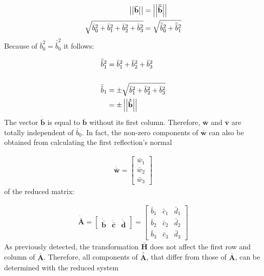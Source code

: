 \begin{align}
\left\vert\left\vert\mathbf{\bar{b}}\right\vert\right\vert 
&= 
\left\vert\left\vert\mathbf{\bar{\bar{b}}}\right\vert\right\vert
\\
\sqrt{\bar{b}_0^2 + \bar{b}_1^2 + \bar{b}_2^2 + \bar{b}_3^2}
&=
\sqrt{\bar{\bar{b}}_0^2 + \bar{\bar{b}}_1^2}
\end{align}
%
Because of $\bar{b}_0^2 = \bar{\bar{b}}_0^2$ it follows:

\begin{align}
\bar{\bar{b}}_1^2
&=
\bar{b}_1^2 + \bar{b}_2^2 + \bar{b}_3^2 
\\
\\
\bar{\bar{b}}_1
&=
\pm \sqrt{\bar{b}_1^2 + \bar{b}_2^2 + \bar{b}_3^2}
\\
&= \pm \left\vert\left\vert\mathbf{\dot{\bar{b}}}\right\vert\right\vert
\end{align}
%
The vector $\mathbf{\dot{\bar{b}}}$ is equal to $\mathbf{\bar{b}}$ without its first column.
Therefore, $\mathbf{\bar{w}}$ and $\mathbf{\bar{v}}$ are totally independent of $\bar{b}_0$.
In fact, the non-zero components of $\mathbf{\bar{w}}$ can also be obtained from calculating the first reflection's normal 

\begin{align}
\mathbf{\dot{\bar{w}}}
= 
\begin{bmatrix}
\bar{w}_1\\
\bar{w}_2\\
\bar{w}_3
\end{bmatrix}
\end{align}
%
of the reduced matrix:

\begin{align}
\mathbf{\dot{\bar{A}}}
=
\begin{bmatrix}
\mathbf{\dot{\bar{b}}} & \mathbf{\dot{\bar{c}}} & \mathbf{\dot{\bar{d}}}
\end{bmatrix}
=
\begin{bmatrix}
\bar{b}_1&\bar{c}_1&\bar{d}_1\\
\bar{b}_2&\bar{c}_2&\bar{d}_2\\
\bar{b}_3&\bar{c}_3&\bar{d}_3
\end{bmatrix}					  
\end{align}
%
As previously detected, the transformation $\mathbf{\bar{H}}$ does not affect the first row and column of $\mathbf{\bar{A}}$.
Therefore, all components of $\mathbf{\bar{\bar{A}}}$, that differ from those of $\mathbf{\bar{A}}$, can be determined with the reduced system

